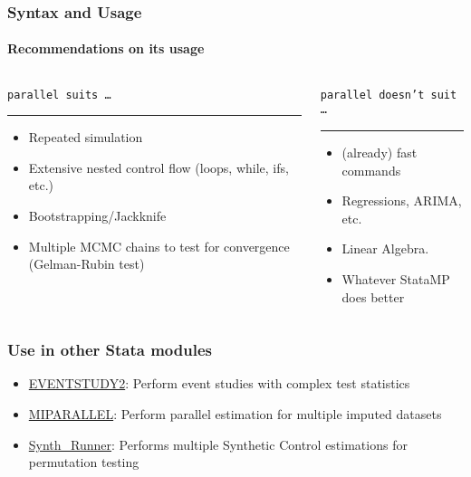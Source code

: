 \documentclass[9pt,\ExtraDocOpts]{beamer}
\begin{document}
\begin{frame}
\frametitle{Syntax and Usage}
\framesubtitle{Recommendations on its usage}

\begin{columns}
\begin{column}{.5\textwidth}
{\color{gray}
{\tt parallel suits \ldots}
\rule{\linewidth}{4pt}}
\begin{itemize}
\item Repeated simulation\pause{}
\item Extensive nested control flow (loops, while, ifs, etc.)\pause{}
\item Bootstrapping/Jackknife\pause{}
\item Multiple MCMC chains to test for convergence (Gelman-Rubin test)\pause{}
\end{itemize}
\end{column}%
\hfill%
\begin{column}{.5\textwidth}
{\color{gray}
{\tt parallel doesn't suit \ldots}
\rule{\linewidth}{4pt}}
\begin{itemize}
\item (already) fast commands\pause{}
\item Regressions, ARIMA, etc.\pause{}
\item Linear Algebra.\pause{}
\item Whatever StataMP does better
\end{itemize}
\end{column}%
\end{columns}
\end{frame}


\begin{frame}
\frametitle{Use in other Stata modules}

\begin{itemize}
\item \href{https://ideas.repec.org/c/boc/bocode/s458086.html}{EVENTSTUDY2}: Perform event studies with complex test statistics 
\item \href{https://ideas.repec.org/c/boc/bocode/s457822.html}{MIPARALLEL}: Perform parallel estimation for multiple imputed datasets 
\item \href{https://github.com/bquistorff/synth_runner}{Synth\_Runner}: Performs multiple Synthetic Control estimations for permutation testing 

\end{itemize}

\end{frame}
\end{document}
